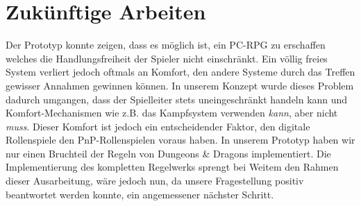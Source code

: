 \section{Zukünftige Arbeiten}
\label{sec:futurework}

Der Prototyp konnte zeigen, dass es möglich ist, ein PC-RPG zu erschaffen welches die Handlungsfreiheit der Spieler nicht einschränkt. Ein völlig freies System verliert jedoch oftmals an Komfort, den andere Systeme durch das Treffen gewisser Annahmen gewinnen können. In unserem Konzept wurde dieses Problem dadurch umgangen, dass der Spielleiter stets uneingeschränkt handeln kann und Komfort-Mechanismen wie z.B. das Kampfsystem verwenden \emph{kann}, aber nicht \emph{muss}. Dieser Komfort ist jedoch ein entscheidender Faktor, den digitale Rollenspiele den PnP-Rollenspielen voraus haben. In unserem Prototyp haben wir nur einen Bruchteil der Regeln von Dungeons \& Dragons implementiert. Die Implementierung des kompletten Regelwerks sprengt bei Weitem den Rahmen dieser Ausarbeitung, wäre jedoch nun, da unsere Fragestellung positiv beantwortet werden konnte, ein angemessener nächster Schritt.

